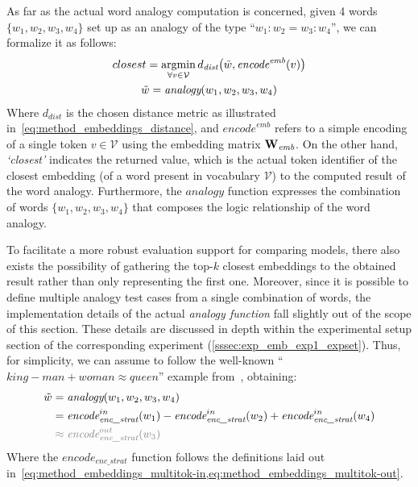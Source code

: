 As far as the actual word analogy computation is concerned, given 4 words $\{w_1, w_2, w_3, w_4\}$ set up as an analogy of the type ``$w_1 : w_2 = w_3 : w_4$'', we can formalize it as follows:
\begin{equation}
    \label{eq:method_embeddings_analogy}
    \begin{gathered}
        closest = \operatornamewithlimits{argmin}_{\forall v \in \mathcal{V}} d_{\textit{dist}}\bigl(\tilde w, \textit{encode}^{\textit{emb}}(v)\bigr) \\
        \tilde w = \textit{analogy}(w_1, w_2, w_3, w_4)
    \end{gathered}
\end{equation}
Where $d_{\textit{dist}}$ is the chosen distance metric as illustrated in~\cref{eq:method_embeddings_distance}, and $\textit{encode}^{\textit{emb}}$ refers to a simple encoding of a single token $v \in \mathcal{V}$ using the embedding matrix $\bm{\mathbf{W}}_{\textit{emb}}$.
On the other hand, \emph{`closest'} indicates the returned value, which is the actual token identifier of the closest embedding (of a word present in vocabulary $\mathcal{V}$) to the computed result of the word analogy.
Furthermore, the $\textit{analogy}$ function expresses the combination of words $\{w_1, w_2, w_3, w_4\}$ that composes the logic relationship of the word analogy.

To facilitate a more robust evaluation support for comparing models, there also exists the possibility of gathering the top-$k$ closest embeddings to the obtained result rather than only representing the first one.
Moreover, since it is possible to define multiple analogy test cases from a single combination of words, the implementation details of the actual \emph{analogy function} fall slightly out of the scope of this section.
These details are discussed in depth within the experimental setup section of the corresponding experiment (\cref{sssec:exp_emb_exp1_expset}).
Thus, for simplicity, we can assume to follow the well-known ``$king - man + woman \approx queen$'' example from~\citet{mikolov2013}, obtaining:
\begin{equation}
    \label{eq:method_embeddings_analogy-function}
    \begin{aligned}
        \tilde w &= \textit{analogy}(w_1, w_2, w_3, w_4) \\
        &= {\textit{encode}}_{\textit{enc\_strat}}^{in}(w_1) - {\textit{encode}}_{\textit{enc\_strat}}^{in}(w_2) + {\textit{encode}}_{\textit{enc\_strat}}^{in}(w_4) \\
        &\color{gray} \approx {\textit{encode}}_{\textit{enc\_strat}}^{out}(w_3) 
    \end{aligned}
\end{equation}
Where the ${\textit{encode}}_{\textit{enc\_strat}}$ function follows the definitions laid out in~\cref{eq:method_embeddings_multitok-in,eq:method_embeddings_multitok-out}.

